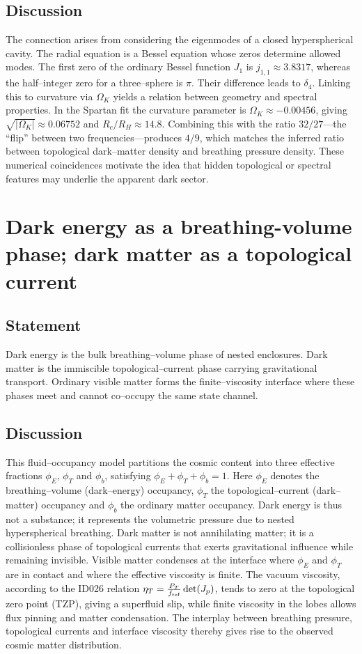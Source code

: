 \documentclass{article}
\begin{document}
\subsection{Discussion}
The connection arises from considering the eigenmodes of a closed hyperspherical cavity.  The radial equation is a Bessel equation whose zeros determine allowed modes.  The first zero of the ordinary Bessel function $J_1$ is $j_{1,1}\approx3.8317$, whereas the half–integer zero for a three–sphere is $\pi$.  Their difference leads to $\delta_4$.  Linking this to curvature via $\Omega_K$ yields a relation between geometry and spectral properties.  In the Spartan fit the curvature parameter is $\Omega_K \approx -0.00456$, giving $\sqrt{|\Omega_K|}\approx0.06752$ and $R_c/R_H\approx14.8$.  Combining this with the ratio $32/27$—the ``flip'' between two frequencies—produces $4/9$, which matches the inferred ratio between topological dark–matter density and breathing pressure density.  These numerical coincidences motivate the idea that hidden topological or spectral features may underlie the apparent dark sector.

\section{Dark energy as a breathing-volume phase; dark matter as a topological current}
\label{sec:interface}
\subsection{Statement}
Dark energy is the bulk breathing–volume phase of nested enclosures.  Dark matter is the immiscible topological–current phase carrying gravitational transport.  Ordinary visible matter forms the finite–viscosity interface where these phases meet and cannot co–occupy the same state channel.

\subsection{Discussion}
This fluid–occupancy model partitions the cosmic content into three effective fractions $\phi_E$, $\phi_T$ and $\phi_b$, satisfying $\phi_E + \phi_T + \phi_b = 1$.  Here $\phi_E$ denotes the breathing–volume (dark–energy) occupancy, $\phi_T$ the topological–current (dark–matter) occupancy and $\phi_b$ the ordinary matter occupancy.  Dark energy is thus not a substance; it represents the volumetric pressure due to nested hyperspherical breathing.  Dark matter is not annihilating matter; it is a collisionless phase of topological currents that exerts gravitational influence while remaining invisible.  Visible matter condenses at the interface where $\phi_E$ and $\phi_T$ are in contact and where the effective viscosity is finite.  The vacuum viscosity, according to the ID026 relation $\eta_T = \frac{P_T}{f_{\rm ref}} \det(J_p)$, tends to zero at the topological zero point (TZP), giving a superfluid slip, while finite viscosity in the lobes allows flux pinning and matter condensation.  The interplay between breathing pressure, topological currents and interface viscosity thereby gives rise to the observed cosmic matter distribution.
\end{document}

